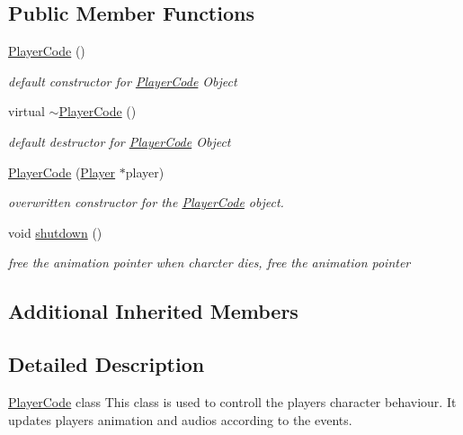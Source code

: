 \subsection*{Public Member Functions}
\begin{DoxyCompactItemize}
\item 
\hyperlink{class_azo_1_1_player_code_a8f40c27c0a16f344eb324321f6b3bd58}{Player\+Code} ()
\begin{DoxyCompactList}\small\item\em default constructor for \hyperlink{class_azo_1_1_player_code}{Player\+Code} Object \end{DoxyCompactList}\item 
virtual \hyperlink{class_azo_1_1_player_code_af59a02bc37b40f8f2b89c2c840105094}{$\sim$\+Player\+Code} ()
\begin{DoxyCompactList}\small\item\em default destructor for \hyperlink{class_azo_1_1_player_code}{Player\+Code} Object \end{DoxyCompactList}\item 
\hyperlink{class_azo_1_1_player_code_a9952382660834549c2fcd2fafb32a20b}{Player\+Code} (\hyperlink{class_azo_1_1_player}{Player} $\ast$player)
\begin{DoxyCompactList}\small\item\em overwritten constructor for the \hyperlink{class_azo_1_1_player_code}{Player\+Code} object. \end{DoxyCompactList}\item 
void \hyperlink{class_azo_1_1_player_code_aea1004e3e9f7c7c58d69f428dd0b5b6f}{shutdown} ()
\begin{DoxyCompactList}\small\item\em free the animation pointer when charcter dies, free the animation pointer \end{DoxyCompactList}\end{DoxyCompactItemize}
\subsection*{Additional Inherited Members}


\subsection{Detailed Description}
\hyperlink{class_azo_1_1_player_code}{Player\+Code} class This class is used to controll the player\textquotesingle{}s character behaviour. It updates player\textquotesingle{}s animation and audios according to the events. 

